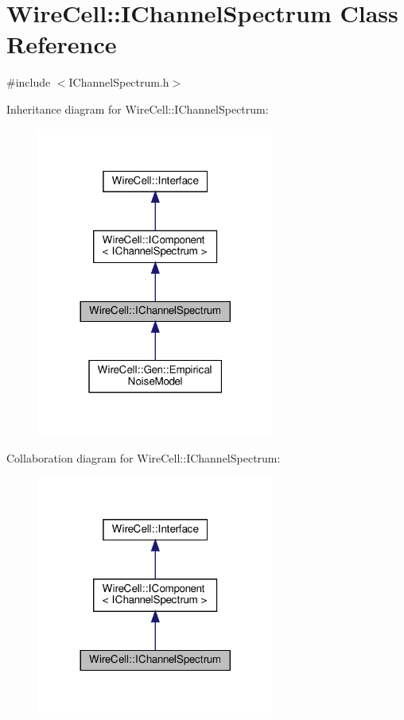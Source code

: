 \hypertarget{class_wire_cell_1_1_i_channel_spectrum}{}\section{Wire\+Cell\+:\+:I\+Channel\+Spectrum Class Reference}
\label{class_wire_cell_1_1_i_channel_spectrum}


{\ttfamily \#include $<$I\+Channel\+Spectrum.\+h$>$}



Inheritance diagram for Wire\+Cell\+:\+:I\+Channel\+Spectrum\+:
\nopagebreak
\begin{figure}[H]
\begin{center}
\leavevmode
\includegraphics[width=221pt]{class_wire_cell_1_1_i_channel_spectrum__inherit__graph}
\end{center}
\end{figure}


Collaboration diagram for Wire\+Cell\+:\+:I\+Channel\+Spectrum\+:
\nopagebreak
\begin{figure}[H]
\begin{center}
\leavevmode
\includegraphics[width=221pt]{class_wire_cell_1_1_i_channel_spectrum__coll__graph}
\end{center}
\end{figure}
